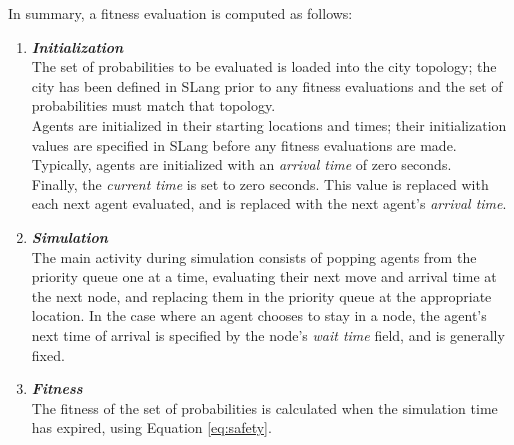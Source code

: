 \documentclass{sig-alternate-05-2015}
\begin{document}
In summary, a fitness evaluation is computed as follows:
\begin{enumerate}
\item \textbf{\textit{Initialization}}\\ The set of probabilities to
  be evaluated is loaded into the city topology; the city has been
  defined in SLang prior to any fitness evaluations and the set of
  probabilities must match that topology.\\ Agents are initialized in
  their starting locations and times; their initialization values are
  specified in SLang before any fitness evaluations are made.
  Typically, agents are initialized with an \emph{arrival time} of zero seconds.\\
  Finally, the \emph{current time} is set to zero
  seconds.  This value is replaced with each next agent evaluated, and
  is replaced with the next agent's \emph{arrival time}.
\item \textbf{\textit{Simulation}}\\ The main activity during
  simulation consists of popping agents from the priority queue one at
  a time, evaluating their next move and arrival time at the next
  node, and replacing them in the priority queue at the appropriate
  location.  In the case where an agent chooses to stay in a node, the
  agent's next time of arrival is specified by the node's
  \emph{wait time} field, and is generally fixed.
\item \textbf{\textit{Fitness}}\\ The fitness of the set of
  probabilities is calculated when the simulation time has expired,
  using Equation \ref{eq:safety}.
\end{enumerate}
%
%
%
%
\end{document}
